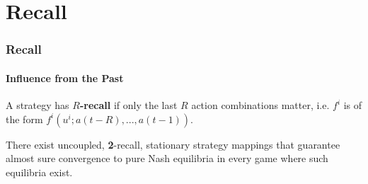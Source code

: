 \documentclass{beamer}
\begin{document}



\section{Recall}

\begin{frame}
    \frametitle{Recall}
    \framesubtitle{Influence from the Past}
    \begin{definition}
        A strategy has $R$\textbf{-recall} if only the last $R$ action combinations matter,
        i.e. $f^i$ is of the form $f^i(u^i; a(t-R), ..., a(t-1))$.
    \end{definition}
    \pause
    \begin{theorem}
        There exist uncoupled, \textbf{2}-recall, stationary strategy mappings that
        guarantee almost sure convergence to
        pure Nash equilibria  in every game where such equilibria exist.
    \end{theorem}
\end{frame}
\end{document}
